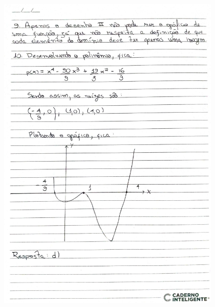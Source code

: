 \documentclass[
  12pt,     %
  openright,      %
  oneside,      %
  a4paper     %
  ]{abntex2}
\begin{document}
\begin{figure}[H]
  \centering
  \includegraphics[scale=0.23]{pagina5.jpg}
\end{figure}
\end{document}
